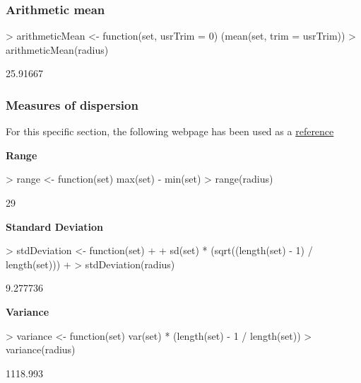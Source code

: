 \documentclass[a4paper]{article}
\begin{document}
\subsubsection*{Arithmetic mean}

\begin{Schunk}
\begin{Sinput}
> arithmeticMean <- function(set, usrTrim = 0) (mean(set, trim = usrTrim))
> arithmeticMean(radius)
\end{Sinput}
\begin{Soutput}
[1] 25.91667
\end{Soutput}
\end{Schunk}


\subsubsection*{Measures of dispersion}
For this specific section, the following webpage has been used as a \href{http://iridl.ldeo.columbia.edu/dochelp/StatTutorial/Dispersion/index.html#Intro}{reference}

\textbf{Range}
\begin{Schunk}
\begin{Sinput}
> range <- function(set) {max(set) - min(set)}
> range(radius)
\end{Sinput}
\begin{Soutput}
[1] 29
\end{Soutput}
\end{Schunk}

\textbf{Standard Deviation}
\begin{Schunk}
\begin{Sinput}
> stdDeviation <- function(set)
+ {
+ sd(set) * (sqrt((length(set) - 1) / length(set)))
+ }
> stdDeviation(radius)
\end{Sinput}
\begin{Soutput}
[1] 9.277736
\end{Soutput}
\end{Schunk}

\textbf{Variance}
\begin{Schunk}
\begin{Sinput}
> variance <- function(set) {var(set) * (length(set) - 1 / length(set))}
> variance(radius)
\end{Sinput}
\begin{Soutput}
[1] 1118.993
\end{Soutput}
\end{Schunk}
\end{document}
